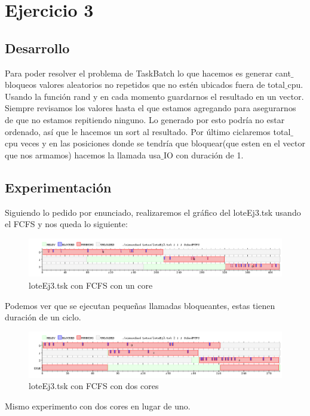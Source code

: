 
\section{Ejercicio 3}

\subsection{Desarrollo}
Para poder resolver el problema de TaskBatch lo que hacemos es generar cant$\_$bloqueos valores aleatorios no repetidos que no estén ubicados fuera de total$\_$cpu. Usando la
función rand y en cada momento guardarnos el resultado en un vector. Siempre revisamos los valores hasta el que estamos agregando para asegurarnos de que no estamos repitiendo
ninguno. Lo generado por esto podría no estar ordenado, así que le hacemos un sort al resultado. Por último ciclaremos total$\_$cpu veces y en las posiciones donde se tendría que 
bloquear(que esten en el vector que nos armamos) hacemos la llamada usa$\_$IO con duración de 1.

\subsection{Experimentación}
Siguiendo lo pedido por enunciado, realizaremos el gráfico del loteEj3.tsk usando el FCFS y nos queda lo siguiente:

\begin{figure}[H]
  \centering
    \includegraphics[width=1.1\textwidth]{imagenes/BatchExperimento.png}
  \caption{loteEj3.tsk con FCFS con un core}
\end{figure}

Podemos ver que se ejecutan pequeñas llamadas bloqueantes, estas tienen duración de un ciclo. 

\begin{figure}[H]
  \centering
    \includegraphics[width=1.1\textwidth]{imagenes/BatchExperimento2cores.png}
  \caption{loteEj3.tsk con FCFS con dos cores}
\end{figure}

Mismo experimento con dos cores en lugar de uno.